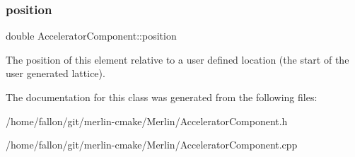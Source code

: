 \subsubsection{\texorpdfstring{position}{position}}
{\footnotesize\ttfamily double Accelerator\+Component\+::position\hspace{0.3cm}{\ttfamily [protected]}}

The position of this element relative to a user defined location (the start of the user generated lattice). 

The documentation for this class was generated from the following files\+:\begin{DoxyCompactItemize}
\item 
/home/fallon/git/merlin-\/cmake/\+Merlin/Accelerator\+Component.\+h\item 
/home/fallon/git/merlin-\/cmake/\+Merlin/Accelerator\+Component.\+cpp\end{DoxyCompactItemize}
